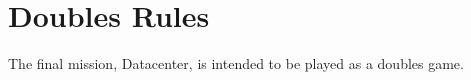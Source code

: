 \clearpage
\chapter{Doubles Rules}

The final mission, Datacenter, is intended to be played as a doubles game.
